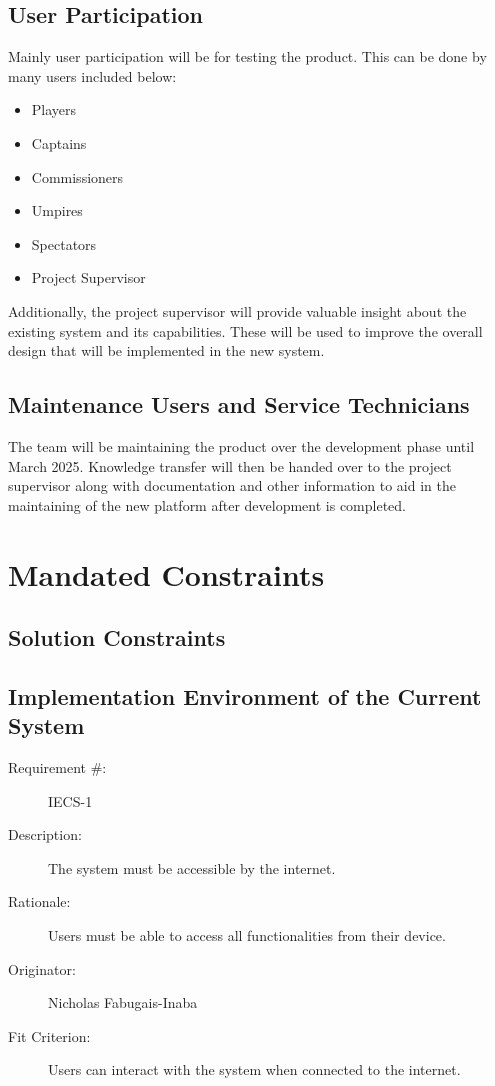 \documentclass[12pt]{article}
\newenvironment{myreq}[1]{%
\setlist[description]{font=\normalfont\color{darkgray}}%
\begin{tcolorbox}[colframe=black,colback=white, sharp corners, boxrule=1pt]%
\bfseries\color{blue}%
\begin{description}#1}%
{\end{description}\end{tcolorbox}}
\newcommand{\twoinline}[2]{\begin{multicols}{2}#1 #2\end{multicols}}
\newcommand{\reqno}{\item[Requirement \#:]}
\newcommand{\reqdesc}{\item[Description:]}
\newcommand{\reqrat}{\item[Rationale:]}
\newcommand{\reqorig}{\item[Originator:]}
\newcommand{\reqfit}{\item[Fit Criterion:]}
\newcommand{\reqsatis}{\item[Customer Satisfaction:]}
\newcommand{\reqdissat}{\item[Customer Dissatisfaction:]}
\begin{document}
\subsection{User Participation}

Mainly user participation will be for testing the product. This can
be done by many users included below:

\begin{itemize}
  \item Players
  \item Captains
  \item Commissioners
  \item Umpires
  \item Spectators
  \item Project Supervisor
\end{itemize}

Additionally, the project supervisor will provide valuable
insight about the existing system and its capabilities. These
will be used to improve the overall design that will be implemented
in the new system.

\subsection{Maintenance Users and Service Technicians}

The team will be maintaining the product over the development phase until
March 2025. Knowledge transfer will then be handed over to the
project supervisor along with documentation and other information to aid
in the maintaining of the new platform after development is completed.

\section{Mandated Constraints}
\subsection{Solution Constraints}

\subsection{Implementation Environment of the Current System}

\begin{myreq}
  \reqno IECS-1
  \reqdesc The system must be accessible by the internet.
  \reqrat Users must be able to access all functionalities from
  their device.
  \reqorig Nicholas Fabugais-Inaba
  \reqfit Users can interact with the system when connected to the
  internet.
  \twoinline
    {\reqsatis 5}
    {\reqdissat 5}
\end{myreq}
\end{document}
